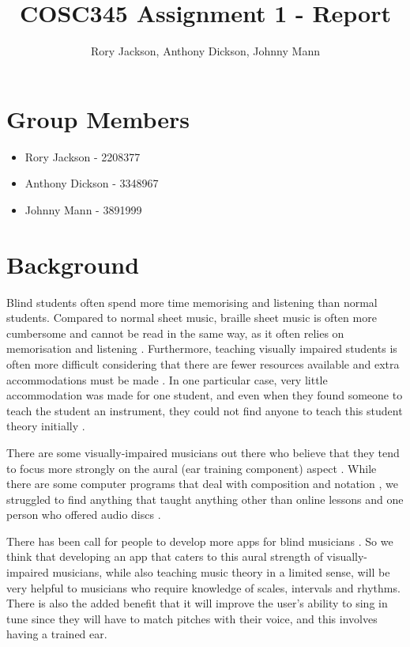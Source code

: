 \documentclass{article}
\title{COSC345 Assignment 1 - Report}
\author{Rory Jackson, Anthony Dickson, Johnny Mann}
\begin{document}
	
\maketitle
\tableofcontents
\newpage

\section{Group Members}
\begin{itemize}
	\item Rory Jackson - 2208377
	\item Anthony Dickson - 3348967
	\item Johnny Mann - 3891999
\end{itemize}
	
\section{Background}
Blind students often spend more time memorising and listening than normal students. Compared to normal sheet music, braille sheet music is often more cumbersome and cannot be read in the same way, as it often relies on memorisation and listening \cite{teachingcollege}. Furthermore, teaching visually impaired students is often more difficult considering that there are fewer resources available and extra accommodations must be made \cite{mtosmt}. In one particular case, very little accommodation was made for one student, and even when they found someone to teach the student an instrument, they could not find anyone to teach this student theory initially \cite{thestar}. 

There are some visually-impaired musicians out there who believe that they tend to focus more strongly on the aural (ear training component) aspect \cite{stuff}\cite{ncbi}. While there are some computer programs that deal with composition and notation \cite{nydailynews}, we struggled to find anything that taught anything other than online lessons and one person who offered audio discs \cite{musicfortheblind}. 

There has been call for people to develop more apps for blind musicians \cite{cdm}. So we think that developing an app that caters to this aural strength of visually-impaired musicians, while also teaching music theory in a limited sense, will be very helpful to musicians who require knowledge of scales, intervals and rhythms. There is also the added benefit that it will improve the user's ability to sing in tune since they will have to match pitches with their voice, and this involves having a trained ear.
\end{document}

